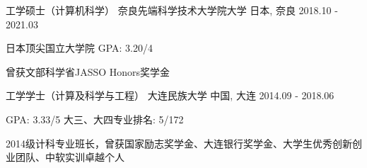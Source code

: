 
\begin{cventries}
 \cventry
    {工学硕士（计算机科学）} %
    {奈良先端科学技术大学院大学} %
    {日本, 奈良} %
    {2018.10 - 2021.03} %
    {
      \begin{cvitems}
      \item {日本顶尖国立大学院 \quad GPA: 3.20/4}
      \item {曾获文部科学省JASSO Honors奖学金}%
      \end{cvitems}
    }

  \cventry
    {工学学士（计算及科学与工程）} %
    {大连民族大学} %
    {中国, 大连} %
    {2014.09 - 2018.06} %
    {
      \begin{cvitems} %
      \item {GPA: 3.33/5 \quad 大三、大四专业排名: 5/172}
      \item {2014级计科专业班长，曾获国家励志奖学金、大连银行奖学金、大学生优秀创新创业团队、中软实训卓越个人}
      \end{cvitems}
    }

\end{cventries}
